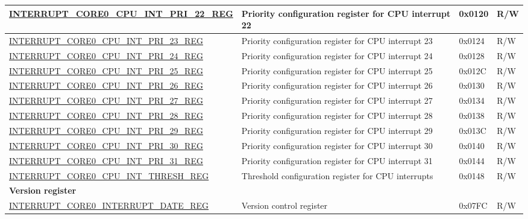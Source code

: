 \begin{longtable}{ | p{10cm} | m{10cm} | m{1.3cm} | m{1.0cm} | }
\hyperref[regdesc:INTERRUPTCORE0CPUINTPRI0REG]{INTERRUPT\_CORE0\_CPU\_INT\_PRI\_22\_REG} & Priority configuration register for CPU interrupt 22 & 0x0120 & R/W \\ \hline
\hyperref[regdesc:INTERRUPTCORE0CPUINTPRI0REG]{INTERRUPT\_CORE0\_CPU\_INT\_PRI\_23\_REG} & Priority configuration register for CPU interrupt 23 & 0x0124 & R/W \\ \hline
\hyperref[regdesc:INTERRUPTCORE0CPUINTPRI0REG]{INTERRUPT\_CORE0\_CPU\_INT\_PRI\_24\_REG} & Priority configuration register for CPU interrupt 24 & 0x0128 & R/W \\ \hline
\hyperref[regdesc:INTERRUPTCORE0CPUINTPRI0REG]{INTERRUPT\_CORE0\_CPU\_INT\_PRI\_25\_REG} & Priority configuration register for CPU interrupt 25 & 0x012C & R/W \\ \hline
\hyperref[regdesc:INTERRUPTCORE0CPUINTPRI0REG]{INTERRUPT\_CORE0\_CPU\_INT\_PRI\_26\_REG} & Priority configuration register for CPU interrupt 26 & 0x0130 & R/W \\ \hline
\hyperref[regdesc:INTERRUPTCORE0CPUINTPRI0REG]{INTERRUPT\_CORE0\_CPU\_INT\_PRI\_27\_REG} & Priority configuration register for CPU interrupt 27 & 0x0134 & R/W \\ \hline
\hyperref[regdesc:INTERRUPTCORE0CPUINTPRI0REG]{INTERRUPT\_CORE0\_CPU\_INT\_PRI\_28\_REG} & Priority configuration register for CPU interrupt 28 & 0x0138 & R/W \\ \hline
\hyperref[regdesc:INTERRUPTCORE0CPUINTPRI0REG]{INTERRUPT\_CORE0\_CPU\_INT\_PRI\_29\_REG} & Priority configuration register for CPU interrupt 29 & 0x013C & R/W \\ \hline
\hyperref[regdesc:INTERRUPTCORE0CPUINTPRI0REG]{INTERRUPT\_CORE0\_CPU\_INT\_PRI\_30\_REG} & Priority configuration register for CPU interrupt 30 & 0x0140 & R/W \\ \hline
\hyperref[regdesc:INTERRUPTCORE0CPUINTPRI0REG]{INTERRUPT\_CORE0\_CPU\_INT\_PRI\_31\_REG} & Priority configuration register for CPU interrupt 31 & 0x0144 & R/W \\ \hline
\hyperref[regdesc:INTERRUPTCORE0CPUINTTHRESHREG]{INTERRUPT\_CORE0\_CPU\_INT\_THRESH\_REG} & Threshold configuration register for CPU interrupts & 0x0148 & R/W \\ \hline
\multicolumn{4}{|l|}{\textbf{Version register}} \\ \hline
\hyperref[regdesc:INTERRUPTCORE0INTERRUPTDATEREG]{INTERRUPT\_CORE0\_INTERRUPT\_DATE\_REG} & Version control register & 0x07FC & R/W \\ \hline
\end{longtable}
